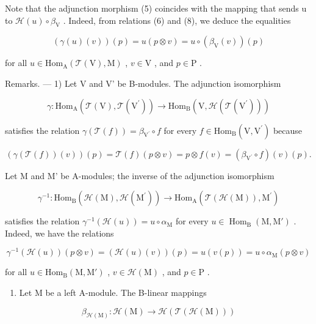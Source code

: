 Note that the adjunction morphism (5) coincides with the mapping that sends u to \(\mathcal{H}(u)\circ\beta_{\mathrm{V}}\) . Indeed, from relations (6) and (8), we deduce the equalities

\[
(\gamma (u) (v)) (p) = u (p \otimes v) = u \circ (\beta_ {\mathrm{V}} (v)) (p)
\]

for all \(u \in \mathrm{Hom}_{\mathrm{A}}(\mathcal{T}(\mathrm{V}), \mathrm{M})\) , \(v \in \mathrm{V}\) , and \(p \in \mathrm{P}\) .

Remarks. --- 1) Let V and V' be B-modules. The adjunction isomorphism

\[
\gamma : \mathrm{Hom} _ {\mathrm{A}} (\mathcal {T} (\mathrm{V}), \mathcal {T} (\mathrm{V} ^ {\prime})) \longrightarrow \mathrm{Hom} _ {\mathrm{B}} (\mathrm{V}, \mathcal {H} (\mathcal {T} (\mathrm{V} ^ {\prime})))
\]

satisfies the relation \(\gamma (\mathcal{T}(f)) = \beta_{\mathrm{V}^{\prime}}\circ f\) for every \(f\in \mathrm{Hom}_{\mathrm{B}}(\mathrm{V},\mathrm{V}^{\prime})\) because

\[
(\gamma (\mathcal {T} (f)) (v)) (p) = \mathcal {T} (f) (p \otimes v) = p \otimes f (v) = (\beta_ {\mathrm{V} ^ {\prime}} \circ f) (v) (p).
\]

Let M and M' be A-modules; the inverse of the adjunction isomorphism

\[
\gamma^ {- 1}: \mathrm{Hom} _ {\mathrm{B}} (\mathcal {H} (\mathrm{M}), \mathcal {H} (\mathrm{M} ^ {\prime})) \longrightarrow \mathrm{Hom} _ {\mathrm{A}} (\mathcal {T} (\mathcal {H} (\mathrm{M})), \mathrm{M} ^ {\prime})
\]

satisfies the relation \(\gamma^{-1}(\mathcal{H}(u)) = u \circ \alpha_{\mathrm{M}}\) for every \(u \in \operatorname{Hom}_{\mathrm{B}}(\mathrm{M}, \mathrm{M}')\) . Indeed, we have the relations

\[
\gamma^ {- 1} (\mathcal {H} (u)) (p \otimes v) = (\mathcal {H} (u) (v)) (p) = u (v (p)) = u \circ \alpha_ {\mathrm{M}} (p \otimes v)
\]

for all \(u \in \mathrm{Hom}_{\mathrm{B}}(\mathrm{M}, \mathrm{M}')\) , \(v \in \mathcal{H}(\mathrm{M})\) , and \(p \in \mathrm{P}\) .

\begin{enumerate}
\def\labelenumi{\arabic{enumi})}
\setcounter{enumi}{1}
\tightlist
\item
  Let \(\mathrm{M}\) be a left A-module. The B-linear mappings
\end{enumerate}

\[
\beta_ {\mathcal {H} (\mathrm{M})}: \mathcal {H} (\mathrm{M}) \to \mathcal {H} (\mathcal {T} (\mathcal {H} (\mathrm{M})))
\]


